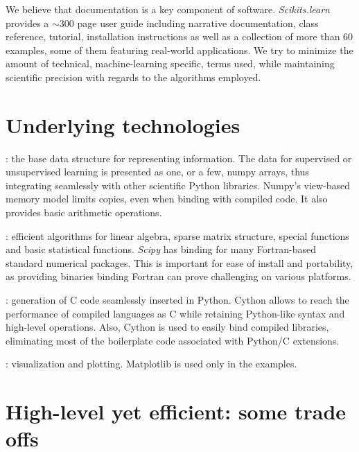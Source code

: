 \documentclass[twoside,11pt]{article}
\begin{document}
\smallskip {}
%
We believe that documentation is a key component of software.
\emph{Scikits.learn} provides a $\sim$300 page user guide including
narrative documentation, class reference, tutorial, installation
instructions as well as a collection of more than 60 examples, some of
them featuring real-world applications. We try to minimize the amount of
technical, machine-learning specific, terms used, while maintaining
scientific precision with regards to the algorithms employed.


\section{Underlying technologies}



\smallskip
{}:
%
the base data structure for representing
information. The data for supervised or unsupervised learning is
presented as one, or a few, numpy arrays, thus integrating seamlessly
with other scientific Python libraries. Numpy's view-based memory 
model limits copies, even when binding with compiled code. It also 
provides basic arithmetic operations. 

\smallskip
{}:
%
efficient algorithms for linear algebra, sparse matrix structure, special
functions and basic statistical functions. {\sl Scipy} has binding for
many Fortran-based standard numerical packages. This is important for
ease of install and portability, as providing binaries binding Fortran
can prove challenging on various platforms. 

\smallskip
{}:
%
generation of C code seamlessly inserted in Python. Cython allows to
reach the performance of compiled languages as C while retaining
Python-like syntax and high-level operations. Also, Cython is used to
easily bind compiled libraries, eliminating most of the boilerplate code
associated with Python/C extensions.

\smallskip
{}:
%
visualization and plotting. Matplotlib is used only in the examples.

\section{High-level yet efficient: some trade offs}
\end{document}

